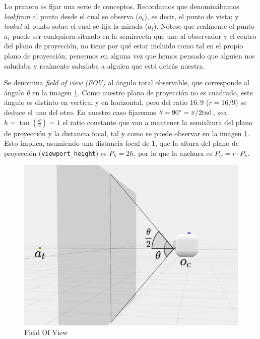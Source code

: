 Lo primero es fijar una serie de conceptos. Recordamos que denominábamos \textit{lookfrom} al punto desde el cual se observa ($o_c$), es decir, el punto de vista; y \textit{lookat} al punto sobre el cual se fija la mirada ($a_t$). Nótese que realmente el punto $a_t$ puede ser cualquiera situado en la semirrecta que une al observador y el centro del plano de proyección, no tiene por qué estar incluido como tal en el propio plano de proyección; pensemos en alguna vez que hemos pensado que alguien nos saludaba y realmente saludaba a alguien que está detrás nuestra.

Se denomina \textit{field of view (FOV)} al ángulo total observable, que corresponde al ángulo $\theta$ en la imagen \ref{fig:fov}. Como nuestro plano de proyección no es cuadrado, este ángulo es distinto en vertical y en horizontal, pero del ratio $16:9$ ($r=16/9$) se deduce el uno del otro. En nuestro caso fijaremos $\theta=90^\circ=\pi/2 \mathrm{rad}$, sea $h=\tan\left(\frac \theta 2\right)=1$ el ratio constante que van a mantener la semialtura del plano de proyección y la distancia focal, tal y como se puede observar en la imagen \ref{fig:fov}. Esto implica, asumiendo una distancia focal de $1$, que la altura del plano de proyección (\verb|viewport_height|) es $P_h=2h$, por lo que la anchura es $P_w=r\cdot P_h$. 

\begin{figure} [ht]
    \centering
    \includegraphics[scale = 0.25]{img/C8/fov.png}
    \caption{Field Of View}
    \label{fig:fov}
\end{figure}

